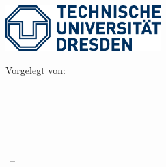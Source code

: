 
\begin{titlepage}

\begin{addmargin}[-1cm]{-3cm}
\begin{center}
\large

\hfill
\vfill

\begingroup
\color{Maroon}\spacedallcaps{\myTitle} \\ \bigskip %
\endgroup
\spacedlowsmallcaps{\mySubtitle} \\ \medskip %


\vfill

%
{
\includegraphics[width=6cm]{figures/tud_logo.eps}
}
\\ \medskip %

Vorgelegt von: \\
\myName \\ %
\myDegree \\
\myDepartment \\
\myFaculty \\
\myUni \\ \bigskip

\myTime\ -- \myVersion %

\vfill

\end{center}
\end{addmargin}

\end{titlepage}
